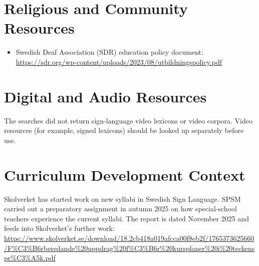 \documentclass[12pt]{article}
\begin{document}
\section{Religious and Community Resources}
\begin{itemize}
\item Swedish Deaf Association (SDR) education policy document: \url{https://sdr.org/wp-content/uploads/2023/08/utbildningspolicy.pdf}
\end{itemize}

\section{Digital and Audio Resources}
The searches did not return sign-language video lexicons or video corpora. Video resources (for example, signed lexicons) should be looked up separately before use.

\section{Curriculum Development Context}
Skolverket has started work on new syllabi in Swedish Sign Language. SPSM carried out a preparatory assignment in autumn 2025 on how special-school teachers experience the current syllabi. The report is dated November 2025 and feeds into Skolverket's further work: \url{https://www.skolverket.se/download/18.2cb418a019afcca00f8eb2f/1765373625660/F%C3%B6rberedande%20uppdrag%20f%C3%B6r%20kursplaner%20i%20teckenspr%C3%A5k.pdf}
\end{document}
